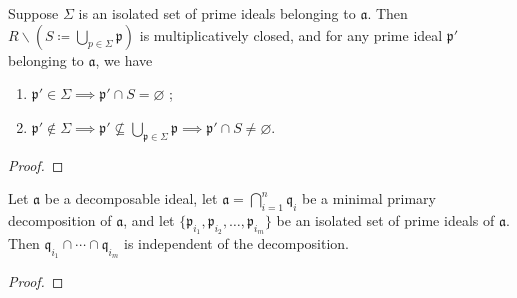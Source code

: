 \begin{proposition}
  Suppose \( \Sigma \) is an isolated set of prime ideals belonging to  \( \mathfrak{a} \). Then \( R \smallsetminus \left( S \coloneq \bigcup_{p \in \Sigma} \mathfrak{p} \right) \) is multiplicatively closed, and for any prime ideal \( \mathfrak{p}' \) belonging to \( \mathfrak{a} \), we have
  \begin{enumerate}[label=\roman*)]
    \item \( \mathfrak{p}' \in \Sigma \implies \mathfrak{p}' \cap S = \varnothing\) ;
    \item \( \mathfrak{p}' \not\in \Sigma \implies \mathfrak{p}' \not\subseteq \bigcup_{\mathfrak{p} \in \Sigma} \mathfrak{p} \implies \mathfrak{p}' \cap S \neq \varnothing\).
  \end{enumerate}
\end{proposition}
\begin{proof}
\end{proof}
\begin{proposition}
  Let \( \mathfrak{a} \) be a decomposable ideal, let \( \mathfrak{a} = \bigcap_{i=1}^n \mathfrak{q}_i \) be a minimal primary decomposition of \( \mathfrak{a} \), and let \( \{\mathfrak{p}_{i_1}, \mathfrak{p}_{i_2}, \ldots, \mathfrak{p}_{i_m}\} \) be an isolated set of prime ideals of \( \mathfrak{a} \). Then \( \mathfrak{q}_{i_1} \cap \cdots \cap \mathfrak{q}_{i_m} \) is independent of the decomposition. 
\end{proposition}
\begin{proof}
\end{proof}
